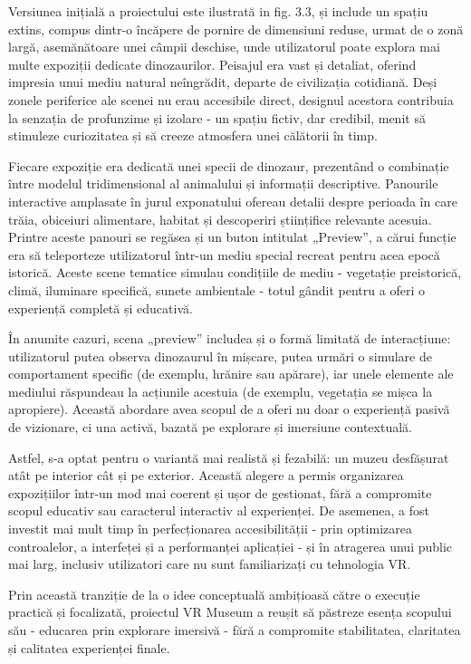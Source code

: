 Versiunea inițială a proiectului este ilustrată in fig. 3.3, și include un spațiu extins, compus dintr-o încăpere de pornire de dimensiuni reduse, urmat de o zonă largă, asemănătoare unei câmpii deschise, unde utilizatorul poate explora mai multe expoziții dedicate dinozaurilor. Peisajul era vast și detaliat, oferind impresia unui mediu natural neîngrădit, departe de civilizația cotidiană. Deși zonele periferice ale scenei nu erau accesibile direct, designul acestora contribuia la senzația de profunzime și izolare - un spațiu fictiv, dar credibil, menit să stimuleze curiozitatea și să creeze atmosfera unei călătorii în timp.

Fiecare expoziție era dedicată unei specii de dinozaur, prezentând o combinație între modelul tridimensional al animalului și informații descriptive. Panourile interactive amplasate în jurul exponatului ofereau detalii despre perioada în care trăia, obiceiuri alimentare, habitat și descoperiri științifice relevante acesuia. Printre aceste panouri se regăsea și un buton intitulat „Preview”, a cărui funcție era să teleporteze utilizatorul într-un mediu special recreat pentru acea epocă istorică. Aceste scene tematice simulau condițiile de mediu - vegetație preistorică, climă, iluminare specifică, sunete ambientale - totul gândit pentru a oferi o experiență completă și educativă.

În anumite cazuri, scena „preview” includea și o formă limitată de interacțiune: utilizatorul putea observa dinozaurul în mișcare, putea urmări o simulare de comportament specific (de exemplu, hrănire sau apărare), iar unele elemente ale mediului răspundeau la acțiunile acestuia (de exemplu, vegetația se mișca la apropiere). Această abordare avea scopul de a oferi nu doar o experiență pasivă de vizionare, ci una activă, bazată pe explorare și imersiune contextuală.

Astfel, s-a optat pentru o variantă mai realistă și fezabilă: un muzeu desfășurat atât pe interior cât și pe exterior. Această alegere a permis organizarea expozițiilor într-un mod mai coerent și ușor de gestionat, fără a compromite scopul educativ sau caracterul interactiv al experienței. De asemenea, a fost investit mai mult timp în perfecționarea accesibilității - prin optimizarea controalelor, a interfeței și a performanței aplicației - și în atragerea unui public mai larg, inclusiv utilizatori care nu sunt familiarizați cu tehnologia VR.

Prin această tranziție de la o idee conceptuală ambițioasă către o execuție practică și focalizată, proiectul VR Museum a reușit să păstreze esența scopului său - educarea prin explorare imersivă - fără a compromite stabilitatea, claritatea și calitatea experienței finale.

